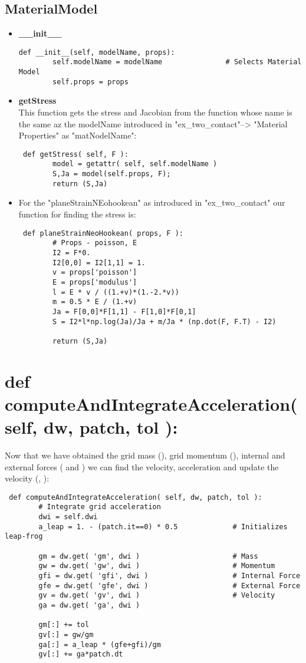 \subsection{MaterialModel}
\begin{itemize}
\item \textbf{\_\_init\_\_}\\
\begin{lstlisting}
def __init__(self, modelName, props):
        self.modelName = modelName               # Selects Material Model
        self.props = props        
\end{lstlisting}
\item \textbf{getStress}\\
This function gets the stress and Jacobian from the function whose name is the same az the modelName introduced in "ex\_two\_contact"--> "Material Properties" as "matNodelName":
\begin{lstlisting}
 def getStress( self, F ):
        model = getattr( self, self.modelName )
        S,Ja = model(self.props, F);    
        return (S,Ja)     
\end{lstlisting}
\item For the  "planeStrainNEohookean" as introduced in "ex\_two\_contact" our function for finding the stress is:
\begin{lstlisting}
 def planeStrainNeoHookean( props, F ):
        # Props - poisson, E
        I2 = F*0.
        I2[0,0] = I2[1,1] = 1.
        v = props['poisson']
        E = props['modulus']
        l = E * v / ((1.+v)*(1.-2.*v))
        m = 0.5 * E / (1.+v)
        Ja = F[0,0]*F[1,1] - F[1,0]*F[0,1]
        S = I2*l*np.log(Ja)/Ja + m/Ja * (np.dot(F, F.T) - I2)
        
        return (S,Ja)    
\end{lstlisting}
\end{itemize}


\section{ def computeAndIntegrateAcceleration( self, dw, patch, tol ):}
Now that we have obtained the grid mass (), grid momentum (), internal and external forces ( and ) we can find the velocity, acceleration and update the velocity (, ):

\begin{lstlisting}
 def computeAndIntegrateAcceleration( self, dw, patch, tol ):
        # Integrate grid acceleration
        dwi = self.dwi
        a_leap = 1. - (patch.it==0) * 0.5             # Initializes leap-frog
        
        gm = dw.get( 'gm', dwi )                      # Mass
        gw = dw.get( 'gw', dwi )                      # Momentum
        gfi = dw.get( 'gfi', dwi )                    # Internal Force
        gfe = dw.get( 'gfe', dwi )                    # External Force
        gv = dw.get( 'gv', dwi )                      # Velocity
        ga = dw.get( 'ga', dwi )
        
        gm[:] += tol
        gv[:] = gw/gm
        ga[:] = a_leap * (gfe+gfi)/gm
        gv[:] += ga*patch.dt
\end{lstlisting}


